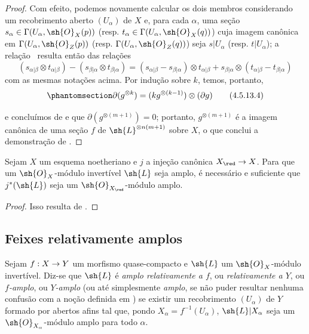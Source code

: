 \documentclass[oneside,10pt]{amsart}
\makeatletter
\newcommand{\ega@arrow}[2]{\mathchoice{#1}{#2}{#2}{#2}}
\renewcommand{\to}{\ega@arrow{\longrightarrow}{\rightarrow}}
\newcommand{\oldpage}[2][]{\marginnote{\normalfont\footnotesize\textbf{#1}~|~#2}\ignorespaces}
\let\EGAOriginalLabel\label
\renewcommand{\label}[1]{\phantomsection\EGAOriginalLabel{#1}}
\makeatother
\begin{document}
\begin{proof}
  Com efeito, podemos novamente calcular os dois membros considerando um recobrimento aberto $(U_\alpha)$ de $X$ e, para cada $\alpha$, uma seção $s_\alpha\in\Gamma(U_\alpha,\sh{O}_X(p))$ (resp. $t_\alpha\in\Gamma(U_\alpha,\sh{O}_X(q))$) cuja imagem canônica em $\Gamma(U_\alpha,\sh{O}_Z(p))$ (resp. $\Gamma(U_\alpha,\sh{O}_Z(q))$) seja $s|U_\alpha$ (resp. $t|U_\alpha$);
  a relação~ resulta então das relações
  \[
    (s_{\alpha|\beta}\otimes t_{\alpha|\beta})-(s_{\beta|\alpha}\otimes t_{\beta|\alpha})
    =(s_{\alpha|\beta}-s_{\beta|\alpha})\otimes t_{\alpha|\beta}+s_{\beta|\alpha}\otimes(t_{\alpha|\beta}-t_{\beta|\alpha})
  \]
  com as mesmas notações acima.
  Por indução sobre $k$, temos, portanto,
  \[
  \label{II.4.5.13.4}
    \partial(g^{\otimes k})=(kg^{\otimes(k-1)})\otimes(\partial g)
  \tag{4.5.13.4}
  \]

\oldpage[II]{89}
  e concluímos de  e  que $\partial(g^{\otimes(m+1)})=0$;
  portanto, $g^{\otimes(m+1)}$ é a imagem canônica de uma seção $f$ de $\sh{L}^{\otimes n(m+1)}$ sobre $X$, o que conclui a demonstração de .
\end{proof}

\begin{corollary}[4.5.14]
\label{II.4.5.14}
Sejam $X$ um esquema noetheriano e $j$ a injeção canônica $X_\red\to X$.
Para que um $\sh{O}_X$-módulo invertível $\sh{L}$ seja amplo, é necessário e suficiente que $j^*(\sh{L})$ seja um $\sh{O}_{X_\red}$-módulo amplo.
\end{corollary}

\begin{proof}
Isso resulta de .
\end{proof}


\subsection{Feixes relativamente amplos}
\label{subsection:II.4.6}

\begin{definition}[4.6.1]
\label{II.4.6.1}
Sejam $f:X\to Y$ um morfismo quase-compacto e $\sh{L}$ um $\sh{O}_X$-módulo invertível.
Diz-se que $\sh{L}$ é \emph{amplo relativamente a $f$}, ou \emph{relativamente a $Y$}, ou \emph{$f$-amplo}, ou \emph{$Y$-amplo} (ou até simplesmente \emph{amplo}, se não puder resultar nenhuma confusão com a noção definida em ) se existir um recobrimento $(U_\alpha)$ de $Y$ formado por abertos afins tal que, pondo $X_\alpha=f^{-1}(U_\alpha)$, $\sh{L}|X_\alpha$ seja um $\sh{O}_{X_\alpha}$-módulo amplo para todo $\alpha$.
\end{definition}
\end{document}
